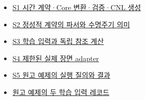 \documentclass[11pt,a4paper]{article}
\begin{document}
\begin{itemize}\setlength{\itemsep}{0pt}\setlength{\parsep}{0pt}\setlength{\topsep}{2pt}
\item \href{\detokenize{../../../../../../projects/04-guardsynth-coc/experiments/paper1_cnl_learning/temporal_preservation.py}}{S1 시간 계약·Core 변환·검증·CNL 생성}
\item \href{\detokenize{../../../../../../platforms/eblc-bcv/src/guard_synth_eblc/action_contract.py}}{S2 정성적 계약의 파서와 수명주기 의미}
\item \href{\detokenize{../../../../../../projects/04-guardsynth-coc/experiments/paper1_cnl_learning/temporal_training_data.py}}{S3 학습 입력과 독립 참조 계산}
\item \href{\detokenize{../../../../../../projects/04-guardsynth-coc/src/guard_synth/qualitative_scene_contract.py}}{S4 제한된 실제 장면 adapter}
\item \href{\detokenize{../methodology-2026-09-30-001/manuscript_examples.json}}{S5 원고 예제의 실행 질의와 결과}
\item \href{\detokenize{../methodology-2026-09-30-001/learning_input_examples.json}}{원고 예제의 두 학습 입력 레코드}
\end{itemize}
\endgroup
\end{document}

